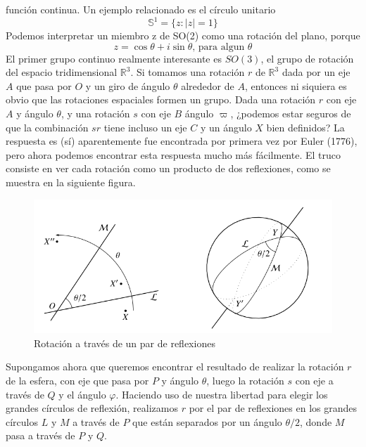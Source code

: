 \documentclass{article}
\numberwithin{equation}{section}
\theoremstyle{plain}  %
\begin{document}
función continua. Un ejemplo relacionado es el círculo unitario
\begin{equation*}
    \mathbb{S}^{1}=\{z : |z|=1\}
\end{equation*}
Podemos interpretar un 
miembro z de SO(2) como una rotación del plano, porque
\begin{equation*}
    z = \cos{\theta}+ i \sin{\theta}\text{, para algun } \theta
\end{equation*} 
El primer grupo continuo realmente interesante es $SO(3)$, el
grupo de rotación del espacio tridimensional $\mathbb{R}^{3}$. Si tomamos
una rotación $r$ de $\mathbb{R}^{3}$ dada por un eje $A$ que pasa por $O$ y un
giro de ángulo $\theta$ alrededor de $A$, entonces ni siquiera es obvio
que las rotaciones espaciales formen un grupo. Dada una
rotación $r$ con eje $A$ y ángulo $\theta$, y una rotación $s$ con eje $B$ 
ángulo $\varpi$, ¿podemos estar seguros de que la combinación $sr$ tiene
incluso un eje $C$ y un ángulo $X$ bien definidos? La respuesta es
(sí) aparentemente fue encontrada por primera vez por Euler
(1776), pero ahora podemos encontrar esta respuesta mucho más
fácilmente. El truco consiste en ver cada rotación como un
producto de dos reflexiones, como se muestra en la siguiente figura. 
\newpage
\begin{figure}[h]
    \centering
    \includegraphics[scale=0.5]{23.3-1.png}
    \caption{Rotación a través de un par de reflexiones}
    \end{figure}
    Supongamos ahora que queremos encontrar el resultado de
    realizar la rotación $r$ de la esfera, con eje que pasa por $P$ y
    ángulo $\theta$, luego la rotación $s$ con eje
    a través de $Q$ y el ángulo $\varphi$. Haciendo uso de nuestra
    libertad para elegir los grandes círculos de reflexión,
    realizamos $r$ por el par de reflexiones en los grandes
    círculos $L$ y $M$ a través de $P$ que están separados por un ángulo $\theta/2$, donde $M$ pasa a través de $P$ y $Q$. 
\end{document}
